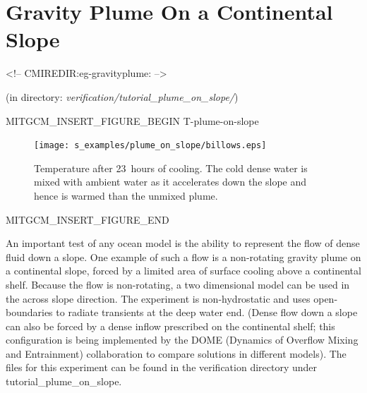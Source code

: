 \section{Gravity Plume On a Continental Slope}
\label{www:tutorials}
\label{sect:eg-gravityplume}
\begin{rawhtml}
<!-- CMIREDIR:eg-gravityplume: -->
\end{rawhtml}
\begin{center}
(in directory: {\it verification/tutorial\_plume\_on\_slope/})
\end{center}

\begin{rawhtml}MITGCM_INSERT_FIGURE_BEGIN T-plume-on-slope\end{rawhtml}
\begin{figure}
\begin{center}
\texttt{[image: s\_examples/plume\_on\_slope/billows.eps]}
\end{center}
\caption{Temperature after 23~hours of cooling. The cold dense water is
mixed with ambient water as it accelerates down the slope and hence
is warmed than the unmixed plume.
}
\label{fig:T-plume-on-slope}
\end{figure}
\begin{rawhtml}MITGCM_INSERT_FIGURE_END\end{rawhtml}

An important test of any ocean model is the ability to represent the
flow of dense fluid down a slope. One example of such a flow is a
non-rotating gravity plume on a continental slope, forced by a limited
area of surface cooling above a continental shelf. Because the flow is
non-rotating, a two dimensional model can be used in the across slope
direction. The experiment is non-hydrostatic and uses open-boundaries
to radiate transients at the deep water end.  (Dense flow down a slope
can also be forced by a dense inflow prescribed on the continental
shelf; this configuration is being implemented by the DOME (Dynamics
of Overflow Mixing and Entrainment) collaboration to compare solutions
in different models). The files for this experiment can be found in
the verification directory under tutorial\_plume\_on\_slope.


